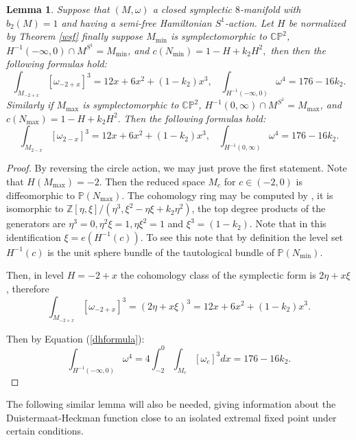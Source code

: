 \documentclass[12pt]{article}
\newtheorem{lemma}[theorem]{Lemma}
\begin{document}
\begin{lemma}  \label{inttwo} Suppose that  $(M,\omega)$  a closed symplectic $8$-manifold with $b_{2}(M)=1$ and having a semi-free Hamiltonian $S^1$-action. Let $H$ be normalized by Theorem \ref{wsf} finally suppose $M_{\min}$ is symplectomorphic to $\mathbb{CP}^2$, $H^{-1}(-\infty,0) \cap M^{S^1} = M_{\min}$, and $c(N_{\min}) = 1 - H + k_2 H^2, $ then then the following formulas hold:  $$\int_{M_{-2+x}} [\omega_{-2+x}]^3 = 12x + 6x^2 +(1 -k_2)x^3, \;\;\; \int_{H^{-1}(-\infty,0)} \omega^{4} = 176  -  16k_2 . $$ 
Similarly if $M_{\max}$ is symplectomorphic to $\mathbb{CP}^2$, $H^{-1}(0,\infty) \cap M^{S^1} = M_{\max}$, and $c(N_{\max}) = 1 - H + k_2 H^2.$ Then the following formulas hold:   $$\int_{M_{2-x}} [\omega_{2-x}]^3 = 12x + 6x^2 +(1 -k_2)x^3, \;\;\; \int_{H^{-1}(0,\infty)} \omega^{4} = 176  -  16k_2 . $$ 
\end{lemma}
\begin{proof}
By reversing the circle action, we may just prove the first statement. Note that $H(M_{\max}) = -2$. Then the  reduced space $M_{c}$ for $c \in (-2,0)$ is diffeomorphic to $\mathbb{P}(N_{\max})$. The cohomology ring may be computed by \cite[Lemma 2.13]{LP2}, it is isomorphic to $\mathbb{Z}[\eta,\xi]/(\eta^3, \xi^2 - \eta \xi + k_{2}\eta^2)$, the top degree products of the generators are $\eta^3=0, \eta^2\xi=1, \eta \xi^2 = 1$ and $\xi^3= (1-k_{2})$.  Note that in this identification $\xi = e(H^{-1}(c))$. To see this note that by definition the level set $H^{-1}(c)$ is the unit sphere bundle of the tautological bundle of $\mathbb{P}(N_{\min}).$

Then, in level $H=-2+x$ the cohomology class of the symplectic form is $2\eta + x\xi$, therefore $$\int_{M_{-2+x}} [\omega_{-2+x}]^3 = (2\eta + x\xi)^3 = 12x + 6x^2 +(1 -k_2)x^3.$$ 

Then by Equation (\ref{dhformula}): $$\int_{H^{-1}(-\infty,0)} \omega^{4} = 4 \int_{-2}^{0}  \int_{M_{c}} [\omega_c]^3 dx = 176 -16k_2.$$\end{proof}

The following similar lemma will also be needed, giving information about the Duistermaat-Heckman function close to an isolated extremal fixed point under certain conditions.
\end{document}
